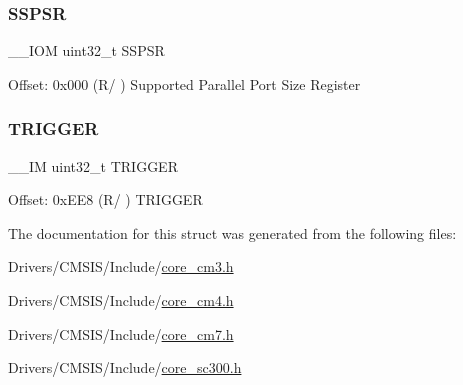 \subsubsection{\texorpdfstring{S\+S\+P\+SR}{SSPSR}}
{\footnotesize\ttfamily \+\_\+\+\_\+\+I\+OM uint32\+\_\+t S\+S\+P\+SR}

Offset\+: 0x000 (R/ ) Supported Parallel Port Size Register \mbox{\label{struct_t_p_i___type_a5590387d8f44b477fd69951a737b0d7e}} 
\subsubsection{\texorpdfstring{T\+R\+I\+G\+G\+ER}{TRIGGER}}
{\footnotesize\ttfamily \+\_\+\+\_\+\+IM uint32\+\_\+t T\+R\+I\+G\+G\+ER}

Offset\+: 0x\+E\+E8 (R/ ) T\+R\+I\+G\+G\+ER 

The documentation for this struct was generated from the following files\+:\begin{DoxyCompactItemize}
\item 
Drivers/\+C\+M\+S\+I\+S/\+Include/\mbox{\hyperlink{core__cm3_8h}{core\+\_\+cm3.\+h}}\item 
Drivers/\+C\+M\+S\+I\+S/\+Include/\mbox{\hyperlink{core__cm4_8h}{core\+\_\+cm4.\+h}}\item 
Drivers/\+C\+M\+S\+I\+S/\+Include/\mbox{\hyperlink{core__cm7_8h}{core\+\_\+cm7.\+h}}\item 
Drivers/\+C\+M\+S\+I\+S/\+Include/\mbox{\hyperlink{core__sc300_8h}{core\+\_\+sc300.\+h}}\end{DoxyCompactItemize}
